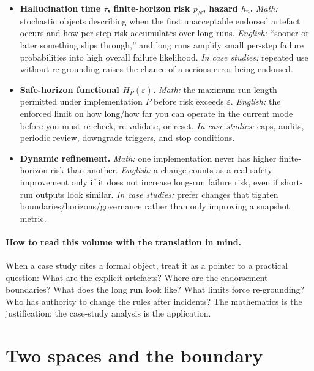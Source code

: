 \begin{itemize}
  \item \textbf{Hallucination time $\tau$, finite-horizon risk $p_N$, hazard $h_n$.}
        \emph{Math:} stochastic objects describing when the first unacceptable endorsed artefact occurs and how
        per-step risk accumulates over long runs.
        \emph{English:} ``sooner or later something slips through,'' and long runs amplify small per-step failure
        probabilities into high overall failure likelihood.
        \emph{In case studies:} repeated use without re-grounding raises the chance of a serious error being endorsed.

  \item \textbf{Safe-horizon functional $H_P(\varepsilon)$.}
        \emph{Math:} the maximum run length permitted under implementation $P$ before risk exceeds $\varepsilon$.
        \emph{English:} the enforced limit on how long/how far you can operate in the current mode before you must
        re-check, re-validate, or reset.
        \emph{In case studies:} caps, audits, periodic review, downgrade triggers, and stop conditions.

  \item \textbf{Dynamic refinement.}
        \emph{Math:} one implementation never has higher finite-horizon risk than another.
        \emph{English:} a change counts as a real safety improvement only if it does not increase long-run failure
        risk, even if short-run outputs look similar.
        \emph{In case studies:} prefer changes that tighten boundaries/horizons/governance rather than only improving
        a snapshot metric.
\end{itemize}

\paragraph{How to read this volume with the translation in mind.}
When a case study cites a formal object, treat it as a pointer to a practical question: What are the
explicit artefacts? Where are the endorsement boundaries? What does the long run look like? What limits
force re-grounding? Who has authority to change the rules after incidents? The mathematics is the
justification; the case-study analysis is the application.

\section{Two spaces and the boundary}
\label{sec:lookup-spaces}

